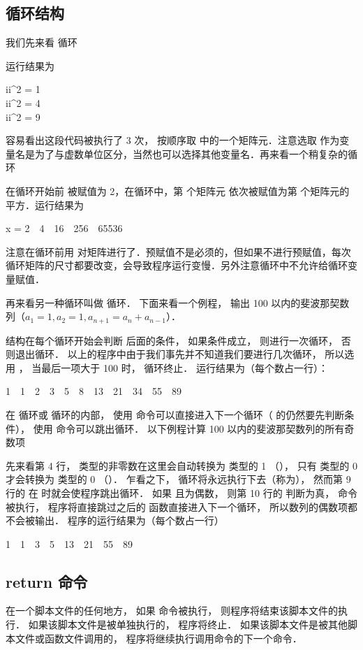 \subsection{循环结构}
我们先来看  循环


运行结果为
\begin{Command}
ii\^{}2 = 1 \\
ii\^{}2 = 4 \\
ii\^{}2 = 9 
\end{Command}
容易看出这段代码被执行了 3 次，  按顺序取  中的一个矩阵元．注意选取  作为变量名是为了与虚数单位区分，当然也可以选择其他变量名．再来看一个稍复杂的循环


在循环开始前  被赋值为 2，在循环中，第  个矩阵元 依次被赋值为第  个矩阵元的平方．运行结果为
\begin{Command}
x = 2\ \ 4\ \ 16\ \ 256\ \ 65536
\end{Command}
注意在循环前用  对矩阵进行了．预赋值不是必须的，但如果不进行预赋值，每次循环矩阵的尺寸都要改变，会导致程序运行变慢．另外注意循环中不允许给循环变量赋值．

再来看另一种循环叫做  循环． 下面来看一个例程， 输出 100 以内的斐波那契数列（$a_1 = 1, a_2 = 1, a_{n+1} = a_{n} + a_{n-1}$）．


 结构在每个循环开始会判断  后面的条件， 如果条件成立， 则进行一次循环， 否则退出循环． 以上的程序中由于我们事先并不知道我们要进行几次循环， 所以选用 ， 当最后一项大于 100 时， 循环终止． 运行结果为（每个数占一行）：
\begin{Command}
1\ \ 1\ \ 2\ \ 3\ \ 5\ \ 8\ \ 13\ \ 21\ \ 34\ \ 55\ \ 89
\end{Command}

在  循环或  循环的内部， 使用  命令可以直接进入下一个循环（ 的仍然要先判断条件）， 使用  命令可以跳出循环． 以下例程计算 100 以内的斐波那契数列的所有奇数项


先来看第 4 行，  类型的非零数在这里会自动转换为  类型的 1 （）， 只有  类型的 0 才会转换为  类型的 0 （）． 乍看之下，  循环将永远执行下去（称为）， 然而第 9 行的  在  时就会使程序跳出循环． 如果  且为偶数， 则第 10 行的  判断为真，  命令被执行， 程序将直接跳过之后的  函数直接进入下一个循环， 所以数列的偶数项都不会被输出． 程序的运行结果为（每个数占一行）
\begin{Command}
1\ \ 1\ \ 3\ \ 5\ \ 13\ \ 21\ \ 55\ \ 89
\end{Command}

\subsection{return 命令}
在一个脚本文件的任何地方， 如果  命令被执行， 则程序将结束该脚本文件的执行． 如果该脚本文件是被单独执行的， 程序将终止． 如果该脚本文件是被其他脚本文件或函数文件调用的， 程序将继续执行调用命令的下一个命令．




